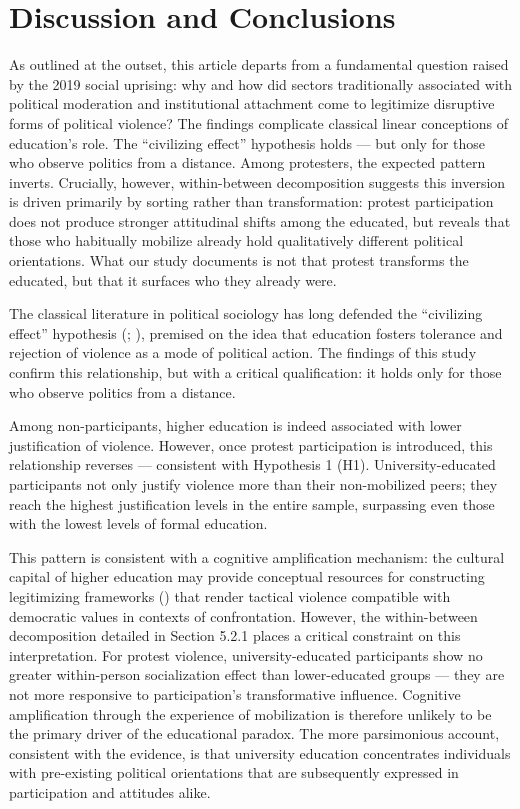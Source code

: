\documentclass[
  13pt,
]{article}
\begin{document}
\section{Discussion and Conclusions}\label{discussion-and-conclusions}

As outlined at the outset, this article departs from a fundamental
question raised by the 2019 social uprising: why and how did sectors
traditionally associated with political moderation and institutional
attachment come to legitimize disruptive forms of political violence?
The findings complicate classical linear conceptions of education's
role. The ``civilizing effect'' hypothesis holds --- but only for those
who observe politics from a distance. Among protesters, the expected
pattern inverts. Crucially, however, within-between decomposition
suggests this inversion is driven primarily by sorting rather than
transformation: protest participation does not produce stronger
attitudinal shifts among the educated, but reveals that those who
habitually mobilize already hold qualitatively different political
orientations. What our study documents is not that protest transforms
the educated, but that it surfaces who they already were.

The classical literature in political sociology has long defended the
``civilizing effect'' hypothesis
(;
), premised on the
idea that education fosters tolerance and rejection of violence as a
mode of political action. The findings of this study confirm this
relationship, but with a critical qualification: it holds only for those
who observe politics from a distance.

Among non-participants, higher education is indeed associated with lower
justification of violence. However, once protest participation is
introduced, this relationship reverses --- consistent with Hypothesis 1
(H1). University-educated participants not only justify violence more
than their non-mobilized peers; they reach the highest justification
levels in the entire sample, surpassing even those with the lowest
levels of formal education.

This pattern is consistent with a cognitive amplification mechanism: the
cultural capital of higher education may provide conceptual resources
for constructing legitimizing frameworks
() that render
tactical violence compatible with democratic values in contexts of
confrontation. However, the within-between decomposition detailed in
Section 5.2.1 places a critical constraint on this interpretation. For
protest violence, university-educated participants show no greater
within-person socialization effect than lower-educated groups --- they
are not more responsive to participation's transformative influence.
Cognitive amplification through the experience of mobilization is
therefore unlikely to be the primary driver of the educational paradox.
The more parsimonious account, consistent with the evidence, is that
university education concentrates individuals with pre-existing
political orientations that are subsequently expressed in participation
and attitudes alike.
\end{document}
